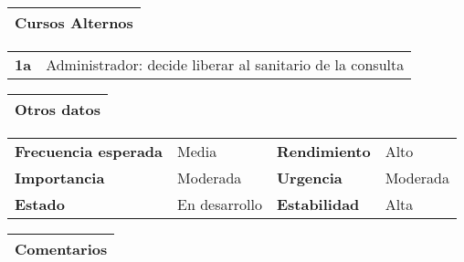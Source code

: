 \documentclass[11pt,a4paper]{article}
\begin{document}
\begin{table}[H]
	\begin{tabularx}{\textwidth}{X}
		\textbf{Cursos Alternos}\\ \hline
	\end{tabularx}
	
	\begin{tabularx}{\textwidth}{cX}
		\textbf{1a} & Administrador: decide liberar al sanitario de la consulta
	\end{tabularx}
\end{table}

\begin{table}[H]
	\begin{tabularx}{\textwidth}{X}
		\textbf{Otros datos}\\ \hline
	\end{tabularx}
	
	\begin{tabularx}{\textwidth}{lXlX}
		\textbf{Frecuencia esperada} & Media & \textbf{Rendimiento} & Alto\\
		\textbf{Importancia} & Moderada & \textbf{Urgencia} & Moderada \\
		\textbf{Estado} & En desarrollo & \textbf{Estabilidad} & Alta\\
	\end{tabularx}
	
	\begin{tabularx}{\textwidth}{X}
		\textbf{Comentarios}\\ \hline
	\end{tabularx}
\end{table}

\newpage


\end{document}
